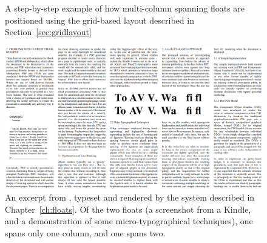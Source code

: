 \begin{figure}
    \hspace{0.04\textwidth}
    \caption[Step through of multi-column layout]{A step-by-step example of how multi-column spanning floats are positioned using the grid-based layout described in Section~\ref{sec:gridlayout}}
    \label{fig:floatlayout}
\end{figure}



\begin{figure}
    \includegraphics[angle=90,origin=c,width=\textwidth]{gfx/floatrendering}
    \caption[A sample rendering with multi-column floats]{An excerpt from \cite{Pinkney2011}, typeset and rendered by the system described in Chapter~\ref{ch:floats}. Of the two floats (a screenshot from a Kindle, and a demonstration of some micro-typographical techniques), one spans only one column, and one spans two. }
    \label{fig:screengrab}
\end{figure}

